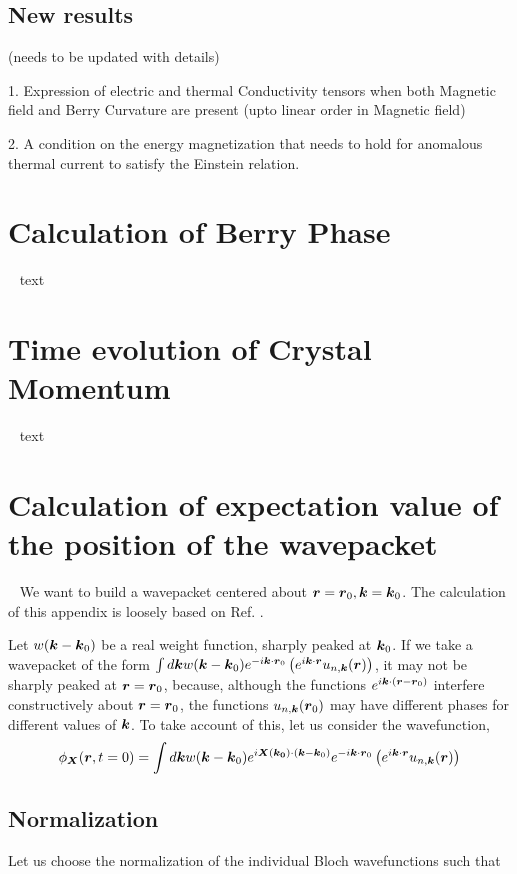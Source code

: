 \documentclass{report}
\renewcommand\vec[1]{\ensuremath\boldsymbol{#1}} %
\begin{document}
\section{New results}
(needs to be updated with details)

1. Expression of electric and thermal Conductivity tensors when both Magnetic field and Berry Curvature are present (upto linear order in Magnetic field)

2. A condition on the energy magnetization that needs to hold for anomalous thermal current to satisfy the Einstein relation.
\appendix
\chapter{Calculation of Berry Phase}~\label{app:BerryPhase}
text
\chapter{Time evolution of Crystal Momentum}~\label{app:crystal-momentum-time-evolution}
text
\chapter{Calculation of expectation value of the position of the wavepacket}~\label{app:center-at-zero-time}
We want to build a wavepacket centered about $\vec{r}= \vec{r}_0, \vec{k}= \vec{k}_0$. The calculation of this appendix is loosely based on Ref. \cite{ralph2020berry}.


Let  $w(\vec{k} - \vec{k}_0)$ be a real weight function, sharply peaked at $\vec{k}_0$. If we take a wavepacket of the form $\int d\vec{k} w(\vec{k} - \vec{k}_0) e^{-i \vec{k} \cdot \vec{r}_0 } \left(e^{i \vec{k} \cdot\vec{r}} u_{n,\vec{k}}(\vec{r})\right)$, it may not be sharply peaked at $\vec{r} = \vec{r}_0$, because, although the functions $e^{i \vec{k} \cdot(\vec{r} - \vec{r}_0)}$ interfere constructively about $\vec{r} = \vec{r}_0$, the functions $u_{n,\vec{k}}(\vec{r}_0)$ may have different phases for different values of $\vec{k}$. To take account of this, let us consider the wavefunction, 
\begin{equation}\label{Eq:wavefunction-X}
	\phi_{\vec{X}}(\vec{r}, t=0) = \int d\vec{k} w(\vec{k} - \vec{k}_0) e^{i \vec{X}(\vec{k_0})\cdot (\vec{k} - \vec{k}_0)} e^{-i \vec{k} \cdot \vec{r}_0 } \left(e^{i \vec{k} \cdot\vec{r}} u_{n,\vec{k}}(\vec{r})\right)
\end{equation}

\section{Normalization} Let us choose the normalization of the individual Bloch wavefunctions such that
\end{document}

